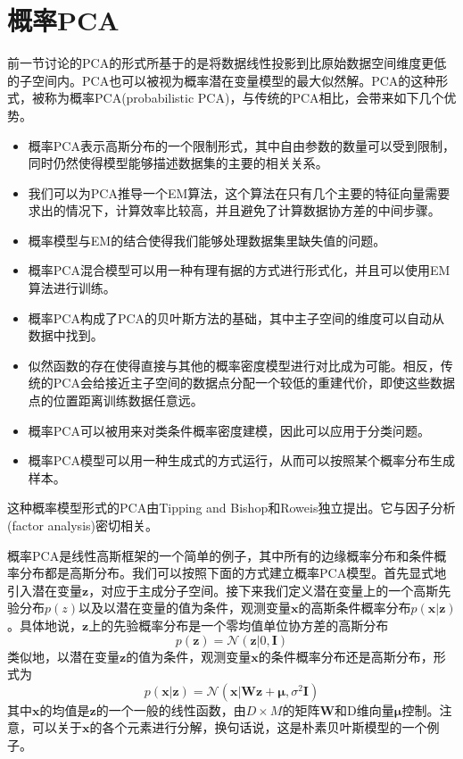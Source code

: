\section{概率PCA}
前一节讨论的PCA的形式所基于的是将数据线性投影到比原始数据空间维度更低的子空间内。PCA也可以被视为概率潜在变量模型的最大似然解。PCA的这种形式，被称为概率PCA(probabilistic PCA)，与传统的PCA相比，会带来如下几个优势。
\begin{itemize}
	\item 概率PCA表示高斯分布的一个限制形式，其中自由参数的数量可以受到限制，同时仍然使得模型能够描述数据集的主要的相关关系。
	\item 我们可以为PCA推导一个EM算法，这个算法在只有几个主要的特征向量需要求出的情况下，计算效率比较高，并且避免了计算数据协方差的中间步骤。
	\item 概率模型与EM的结合使得我们能够处理数据集里缺失值的问题。
	\item 概率PCA混合模型可以用一种有理有据的方式进行形式化，并且可以使用EM算法进行训练。
	\item 概率PCA构成了PCA的贝叶斯方法的基础，其中主子空间的维度可以自动从数据中找到。
	\item 似然函数的存在使得直接与其他的概率密度模型进行对比成为可能。相反，传统的PCA会给接近主子空间的数据点分配一个较低的重建代价，即使这些数据点的位置距离训练数据任意远。
	\item 概率PCA可以被用来对类条件概率密度建模，因此可以应用于分类问题。
	\item 概率PCA模型可以用一种生成式的方式运行，从而可以按照某个概率分布生成样本。
\end{itemize}
这种概率模型形式的PCA由Tipping and Bishop和Roweis独立提出。它与因子分析(factor analysis)密切相关。

概率PCA是线性高斯框架的一个简单的例子，其中所有的边缘概率分布和条件概率分布都是高斯分布。我们可以按照下面的方式建立概率PCA模型。首先显式地引入潜在变量$\boldsymbol{z}$，对应于主成分子空间。接下来我们定义潜在变量上的一个高斯先验分布$p(z)$以及以潜在变量的值为条件，观测变量$\boldsymbol{x}$的高斯条件概率分布$p(\boldsymbol{x}|\boldsymbol{z})$。具体地说，$\boldsymbol{z}$上的先验概率分布是一个零均值单位协方差的高斯分布
\begin{equation}
	p(\boldsymbol{z})=\mathcal{N}(\boldsymbol{z}|0,\boldsymbol{I})
\end{equation}
类似地，以潜在变量$\boldsymbol{z}$的值为条件，观测变量$\boldsymbol{x}$的条件概率分布还是高斯分布，形式为
\begin{equation}
	p(\boldsymbol{x}|\boldsymbol{z})=\mathcal{N}(\boldsymbol{x}|\boldsymbol{W}\boldsymbol{z}+\boldsymbol{\mu},\sigma^2\boldsymbol{I})
\end{equation}
其中$\boldsymbol{x}$的均值是$\boldsymbol{z}$的一个一般的线性函数，由$D\times M$的矩阵$\boldsymbol{W}$和D维向量$\boldsymbol{\mu}$控制。注意，可以关于$\boldsymbol{x}$的各个元素进行分解，换句话说，这是朴素贝叶斯模型的一个例子。

